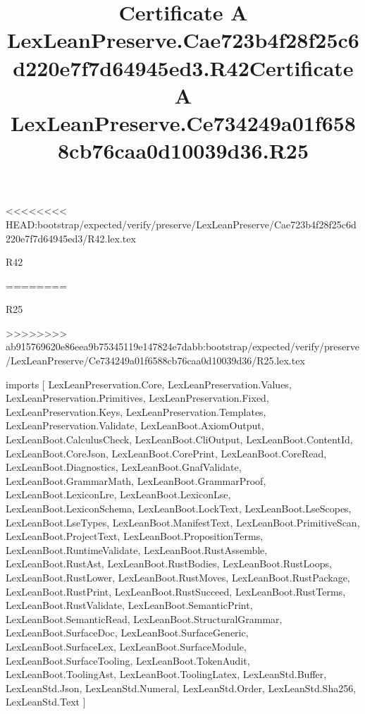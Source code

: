 <<<<<<<< HEAD:bootstrap/expected/verify/preserve/LexLeanPreserve/Cae723b4f28f25c6d220e7f7d64945ed3/R42.lex.tex
\begin{lexlean}{R42}
\title{Certificate A LexLeanPreserve.Cae723b4f28f25c6d220e7f7d64945ed3.R42}
========
\begin{lexlean}{R25}
\title{Certificate A LexLeanPreserve.Ce734249a01f6588cb76caa0d10039d36.R25}
>>>>>>>> ab915769620e86eea9b75345119e147824e7dabb:bootstrap/expected/verify/preserve/LexLeanPreserve/Ce734249a01f6588cb76caa0d10039d36/R25.lex.tex
\begin{coremodule}
imports [
  LexLeanPreservation.Core,
  LexLeanPreservation.Values,
  LexLeanPreservation.Primitives,
  LexLeanPreservation.Fixed,
  LexLeanPreservation.Keys,
  LexLeanPreservation.Templates,
  LexLeanPreservation.Validate,
  LexLeanBoot.AxiomOutput,
  LexLeanBoot.CalculusCheck,
  LexLeanBoot.CliOutput,
  LexLeanBoot.ContentId,
  LexLeanBoot.CoreJson,
  LexLeanBoot.CorePrint,
  LexLeanBoot.CoreRead,
  LexLeanBoot.Diagnostics,
  LexLeanBoot.GnafValidate,
  LexLeanBoot.GrammarMath,
  LexLeanBoot.GrammarProof,
  LexLeanBoot.LexiconLre,
  LexLeanBoot.LexiconLse,
  LexLeanBoot.LexiconSchema,
  LexLeanBoot.LockText,
  LexLeanBoot.LseScopes,
  LexLeanBoot.LseTypes,
  LexLeanBoot.ManifestText,
  LexLeanBoot.PrimitiveScan,
  LexLeanBoot.ProjectText,
  LexLeanBoot.PropositionTerms,
  LexLeanBoot.RuntimeValidate,
  LexLeanBoot.RustAssemble,
  LexLeanBoot.RustAst,
  LexLeanBoot.RustBodies,
  LexLeanBoot.RustLoops,
  LexLeanBoot.RustLower,
  LexLeanBoot.RustMoves,
  LexLeanBoot.RustPackage,
  LexLeanBoot.RustPrint,
  LexLeanBoot.RustSucceed,
  LexLeanBoot.RustTerms,
  LexLeanBoot.RustValidate,
  LexLeanBoot.SemanticPrint,
  LexLeanBoot.SemanticRead,
  LexLeanBoot.StructuralGrammar,
  LexLeanBoot.SurfaceDoc,
  LexLeanBoot.SurfaceGeneric,
  LexLeanBoot.SurfaceLex,
  LexLeanBoot.SurfaceModule,
  LexLeanBoot.SurfaceTooling,
  LexLeanBoot.TokenAudit,
  LexLeanBoot.ToolingAst,
  LexLeanBoot.ToolingLatex,
  LexLeanStd.Buffer,
  LexLeanStd.Json,
  LexLeanStd.Numeral,
  LexLeanStd.Order,
  LexLeanStd.Sha256,
  LexLeanStd.Text
]


\end{coremodule}
\end{lexlean}
\end{lexlean}
